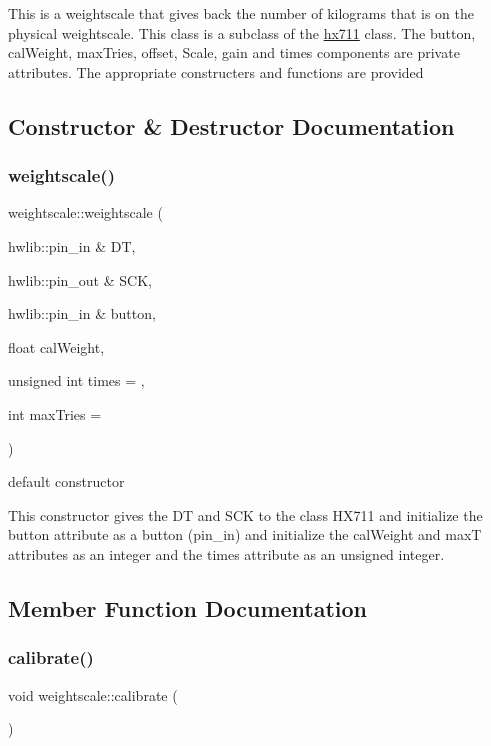 This is a weightscale that gives back the number of kilograms that is on the physical weightscale. This class is a subclass of the \hyperlink{classhx711}{hx711} class. The button, cal\+Weight, max\+Tries, offset, Scale, gain and times components are private attributes. The appropriate constructers and functions are provided 

\subsection{Constructor \& Destructor Documentation}
\mbox{\label{classweightscale_a9d0086222cb067092a3c5f0ebd59cecb}} 
\subsubsection{\texorpdfstring{weightscale()}{weightscale()}}
{\footnotesize\ttfamily weightscale\+::weightscale (\begin{DoxyParamCaption}\item[{hwlib\+::pin\+\_\+in \&}]{DT,  }\item[{hwlib\+::pin\+\_\+out \&}]{S\+CK,  }\item[{hwlib\+::pin\+\_\+in \&}]{button,  }\item[{float}]{cal\+Weight,  }\item[{unsigned int}]{times = {},  }\item[{int}]{max\+Tries = {} }\end{DoxyParamCaption})}



default constructor 

This constructor gives the DT and S\+CK to the class H\+X711 and initialize the button attribute as a button (pin\+\_\+in) and initialize the cal\+Weight and maxT attributes as an integer and the times attribute as an unsigned integer. 

\subsection{Member Function Documentation}
\mbox{\label{classweightscale_a3110537ecd03d645d30660f5dbd9435b}} 
\subsubsection{\texorpdfstring{calibrate()}{calibrate()}}
{\footnotesize\ttfamily void weightscale\+::calibrate (\begin{DoxyParamCaption}{ }\end{DoxyParamCaption})}



